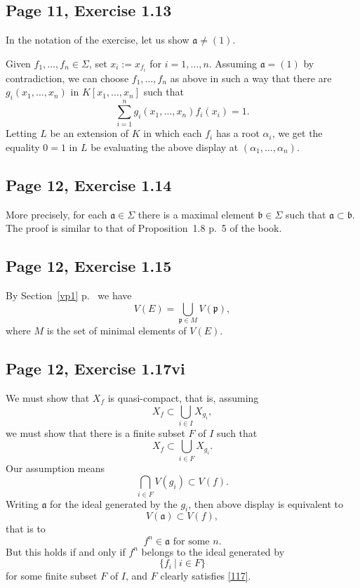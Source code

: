 \documentclass[parskip=half,fontsize=12pt]{scrartcl}%
\newcommand{\mf}{\mathfrak}
\newcommand{\aaa}{\mf a}
\newcommand{\bbb}{\mf b}
\newcommand{\ppp}{\mf p}
\begin{document}
\subsection{Page 11, Exercise 1.13}%

In the notation of the exercise, let us show $\aaa\neq(1)$. 

Given $f_1,\dots,f_n\in\Sigma$, set $x_i:=x_{f_i}$ for $i=1,\dots,n$. Assuming $\aaa=(1)$ by contradiction, we can choose $f_1,\dots,f_n$ as above in such a way that there are $g_i(x_1,\dots,x_n)$ in $K[x_1,\dots,x_n]$ such that 
$$
\sum_{i=1}^n g_i(x_1,\dots,x_n)f_i(x_i)=1.
$$ 
Letting $L$ be an extension of $K$ in which each $f_i$ has a root $\alpha_i$, we get the equality $0=1$ in $L$ be evaluating the above display at $(\alpha_1,\dots,\alpha_n)$.

\subsection{Page 12, Exercise 1.14}\label{114}%

More precisely, for each $\mf a\in\Sigma$ there is a maximal element $\bbb\in\Sigma$ such that $\mf a\subset\bbb$. The proof is similar to that of Proposition~1.8 p.~5 of the book.

\subsection{Page 12, Exercise 1.15}\label{vp2}%

By Section~\ref{vp1} p.~\pageref{vp1} we have 
$$
V(E)=\bigcup_{\ppp\in M}V(\ppp),
$$ 
where $M$ is the set of minimal elements of $V(E)$.

\subsection{Page 12, Exercise 1.17vi}%

We must show that $X_f$ is quasi-compact, that is, assuming 
$$
X_f\subset\bigcup_{i\in I}X_{g_i},
$$ 
we must show that there is a finite subset $F$ of $I$ such that 
\begin{equation}\label{117}
X_f\subset\bigcup_{i\in F}X_{g_i}.
\end{equation}
Our assumption means 
$$
\bigcap_{i\in F}V(g_i)\subset V(f).
$$ 
Writing $\aaa$ for the ideal generated by the $g_i$, then above display is equivalent to 
$$
V(\aaa)\subset V(f),
$$ 
that is to 
$$
f^n\in\aaa\text{ for some } n.
$$ 
But this holds if and only if $f^n$ belongs to the ideal generated by 
$$
\{f_i\ |\ i\in F\}
$$ 
for some finite subset $F$ of $I$, and $F$ clearly satisfies \eqref{117}.
\end{document}
